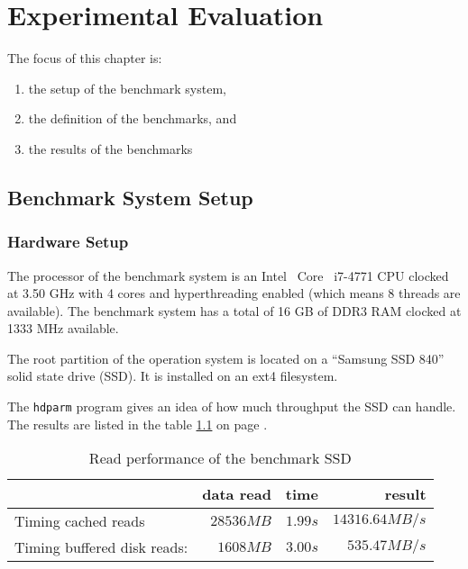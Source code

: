 \chapter{Experimental Evaluation}


The focus of this chapter is:
\begin{enumerate}
\item the setup of the benchmark system,
\item the definition of the benchmarks, and
\item the results of the benchmarks
\end{enumerate}

%

\section{Benchmark System Setup}
  \subsection{Hardware Setup}

The processor of the benchmark system is an Intel\textregistered~ Core\texttrademark~ i7-4771 CPU clocked at 3.50 GHz with 4 cores and hyperthreading enabled (which means 8 threads are available).
The benchmark system has a total of 16 GB of DDR3 RAM clocked at 1333 MHz available.

The root partition of the operation system is located on a ``Samsung SSD 840'' solid state drive (SSD).
It is installed on an ext4 filesystem.

The \texttt{hdparm} program gives an idea of how much throughput the SSD can handle. The results are listed in the table \ref{eval-ssd} on page \pageref{eval-ssd}.

\begin{table}[h]
\centering
\caption{Read performance of the benchmark SSD}
\label{eval-ssd}
\begin{tabular}{lrrr}
\textbf{}                   & \textbf{data read} & \textbf{time} & \textbf{result} \\ \hline
Timing cached reads         & $28536 MB$         & $1.99 s$      & $14316.64 MB/s$ \\
Timing buffered disk reads: & $1608 MB$          & $3.00 s$      & $535.47 MB/s$   \\ \hline
\end{tabular}
\end{table}

